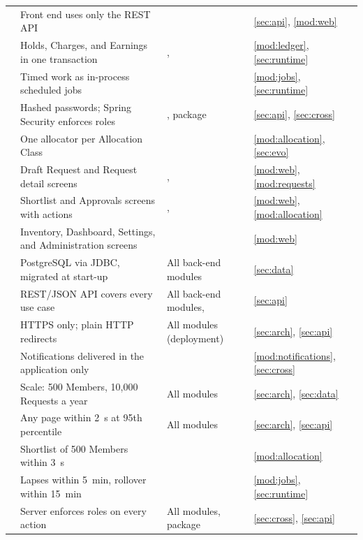 {\begin{longtable}{@{}L{4.75cm}L{\dimexpr\textwidth-10.05cm-6\tabcolsep\relax}L{3.6cm}L{1.7cm}@{}}
 & Front end uses only the REST API &  & \ref{sec:api}, \ref{mod:web} \\
 & Holds, Charges, and Earnings in one transaction & ,  & \ref{mod:ledger}, \ref{sec:runtime} \\
 & Timed work as in-process scheduled jobs &  & \ref{mod:jobs}, \ref{sec:runtime} \\
 & Hashed passwords; Spring Security enforces roles & ,  package & \ref{sec:api}, \ref{sec:cross} \\
 & One allocator per Allocation Class &  & \ref{mod:allocation}, \ref{sec:evo} \\
 & Draft Request and Request detail screens & ,  & \ref{mod:web}, \ref{mod:requests} \\
 & Shortlist and Approvals screens with actions & ,  & \ref{mod:web}, \ref{mod:allocation} \\
 & Inventory, Dashboard, Settings, and Administration screens &  & \ref{mod:web} \\
 & PostgreSQL via JDBC, migrated at start-up & All back-end modules & \ref{sec:data} \\
 & REST/JSON API covers every use case & All back-end modules,  & \ref{sec:api} \\
 & HTTPS only; plain HTTP redirects & All modules (deployment) & \ref{sec:arch}, \ref{sec:api} \\
 & Notifications delivered in the application only &  & \ref{mod:notifications}, \ref{sec:cross} \\
 & Scale: 500 Members, 10,000 Requests a year & All modules & \ref{sec:arch}, \ref{sec:data} \\
 & Any page within 2~s at 95th percentile & All modules & \ref{sec:arch}, \ref{sec:api} \\
 & Shortlist of 500 Members within 3~s &  & \ref{mod:allocation} \\
 & Lapses within 5~min, rollover within 15~min &  & \ref{mod:jobs}, \ref{sec:runtime} \\
 & Server enforces roles on every action & All modules,  package & \ref{sec:cross}, \ref{sec:api} \\

\end{longtable}}

